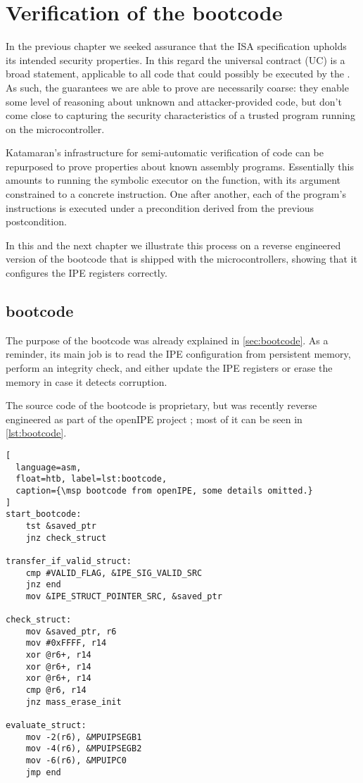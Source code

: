 \chapter{Verification of the \texorpdfstring{\msp}{MSP430} bootcode}
\label{ch:block-verifier}

In the previous chapter we seeked assurance that the ISA specification upholds its intended security properties. In this regard the universal contract (UC) is a broad statement, applicable to all code that could possibly be executed by the \msp. As such, the guarantees we are able to prove are necessarily coarse: they enable some level of reasoning about unknown and attacker-provided code, but don't come close to capturing the security characteristics of a trusted program running on the microcontroller.

Katamaran's infrastructure for semi-automatic verification of \usail code can be repurposed to prove properties about known assembly programs. Essentially this amounts to running the symbolic executor on the  function, with its argument constrained to a concrete instruction. One after another, each of the program's instructions is executed under a precondition derived from the previous postcondition.

In this and the next chapter we illustrate this process on a reverse engineered version \cite{Bognar2025} of the bootcode that is shipped with the \msp microcontrollers, showing that it configures the IPE registers correctly.

\section{\texorpdfstring{\msp}{MSP430} bootcode}

The purpose of the bootcode was already explained in \cref{sec:bootcode}. As a reminder, its main job is to read the IPE configuration from persistent memory, perform an integrity check, and either update the IPE registers or erase the memory in case it detects corruption.

The source code of the bootcode is proprietary, but was recently reverse engineered as part of the openIPE project \cite{Bognar2025}; most of it can be seen in \cref{lst:bootcode}.

\begin{lstlisting}[
  language=asm,
  float=htb, label=lst:bootcode,
  caption={\msp bootcode from openIPE, some details omitted.}
]
start_bootcode:
    tst &saved_ptr
    jnz check_struct

transfer_if_valid_struct:
    cmp #VALID_FLAG, &IPE_SIG_VALID_SRC
    jnz end
    mov &IPE_STRUCT_POINTER_SRC, &saved_ptr

check_struct:
    mov &saved_ptr, r6
    mov #0xFFFF, r14
    xor @r6+, r14
    xor @r6+, r14
    xor @r6+, r14
    cmp @r6, r14
    jnz mass_erase_init

evaluate_struct:
    mov -2(r6), &MPUIPSEGB1
    mov -4(r6), &MPUIPSEGB2
    mov -6(r6), &MPUIPC0
    jmp end
\end{lstlisting}


